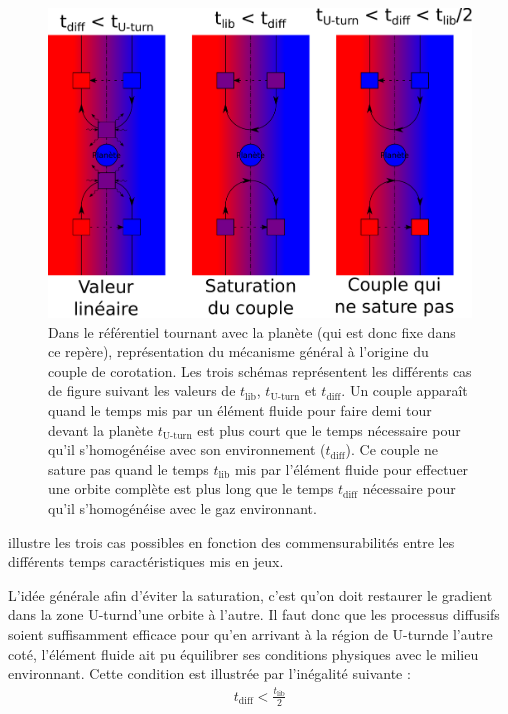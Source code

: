 \begin{figure}[htb]
\centering
\includegraphics[width=0.75\linewidth]{figure/corotation_principle.pdf}
\caption{Dans le référentiel tournant avec la planète (qui est donc fixe dans ce repère), représentation du mécanisme général à l'origine du couple de corotation. Les trois schémas représentent les différents cas de figure suivant les valeurs de $t_\text{lib}$, $t_\text{U-turn}$ et $t_\text{diff}$. Un couple apparaît quand le temps mis par un élément fluide pour faire demi tour devant la planète $t_\text{U-turn}$ est plus court que le temps nécessaire pour qu'il s'homogénéise avec son environnement ($t_\text{diff}$). Ce couple ne sature pas quand le temps $t_\text{lib}$ mis par l'élément fluide pour effectuer une orbite complète est plus long que le temps $t_\text{diff}$ nécessaire pour qu'il s'homogénéise avec le gaz environnant. }\label{fig:corotation_principle}
\end{figure}

 illustre les trois cas possibles en fonction des commensurabilités entre les différents temps caractéristiques mis en jeux.

L'idée générale afin d'éviter la saturation, c'est qu'on doit restaurer le gradient dans la zone \og U-turn\fg d'une orbite à l'autre. Il faut donc que les processus diffusifs soient suffisamment efficace pour qu'en arrivant à la région de \og U-turn\fg de l'autre coté, l'élément fluide ait pu équilibrer ses conditions physiques avec le milieu environnant. Cette condition est illustrée par l'inégalité suivante : 
\begin{align}
t_\text{diff} < \frac{t_\text{lib}}{2}
\end{align}

